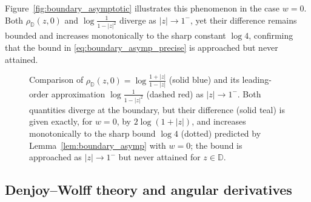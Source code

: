 \documentclass[10pt,a4paper]{amsart}
\numberwithin{equation}{section}
\begin{document}
Figure~\ref{fig:boundary_asymptotic} illustrates this phenomenon in the case $w=0$. Both
$\rho_{\mathbb D}(z,0)$ and $\log\frac{1}{1-|z|^2}$ diverge as $|z|\to1^-$, yet their difference
remains bounded and increases monotonically to the sharp constant $\log 4$, confirming that the
bound in \eqref{eq:boundary_asymp_precise} is approached but never attained.
\begin{figure}
    \centering

    \caption{Comparison of $\rho_{\mathbb D}(z,0)=\log\frac{1+|z|}{1-|z|}$ (solid blue) and its
leading-order approximation $\log\frac{1}{1-|z|^2}$ (dashed red) as $|z|\to 1^-$. Both quantities
diverge at the boundary, but their difference (solid teal) is given exactly, for $w=0$, by
$2\log(1+|z|)$, and increases monotonically to the sharp bound $\log 4$ (dotted) predicted by
Lemma~\ref{lem:boundary_asymp} with $w=0$; the bound is approached as $|z|\to 1^-$ but never
attained for $z\in\mathbb D$.}
\label{fig:boundary_asymptotic}
\label{fig:placeholder}
\end{figure}
\subsection{Denjoy--Wolff theory and angular derivatives}
\label{subsec:dw}
\end{document}
